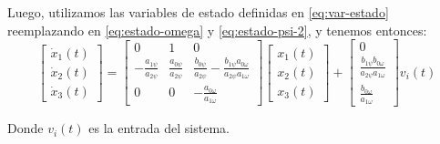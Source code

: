 Luego, utilizamos las variables de estado definidas en \eqref{eq:var-estado}
reemplazando en \eqref{eq:estado-omega} y \eqref{eq:estado-psi-2}, y tenemos
entonces:
\begin{equation}
  \begin{bmatrix}\dot x_{1}(t) \\ \dot x_{2}(t) \\ \dot x_{3}(t)\end{bmatrix} =
    \begin{bmatrix}
      0 & 1 & 0 \\
      -\frac{a_{1\psi}}{a_{2\psi}} & \frac{a_{0\psi}}{a_{2\psi}} & \frac{b_{0\psi}}{a_{2\psi}} - \frac{b_{1\psi}a_{0\omega}}{a_{2\psi}a_{1\omega}} \\
      0 & 0 & -\frac{a_{0\omega}}{a_{1\omega}}
    \end{bmatrix}
    \begin{bmatrix}x_{1}(t) \\ x_{2}(t) \\ x_{3}(t)\end{bmatrix} +
    \begin{bmatrix}
      0 \\
      \frac{b_{1\psi}b_{0\omega}}{a_{2\psi}a_{1\omega}} \\
      \frac{b_{0\omega}}{a_{1\omega}}
    \end{bmatrix}
    v_{i} (t)
\end{equation}

Donde $v_{i} (t)$ es la entrada del sistema.

\FloatBarrier
\newpage
